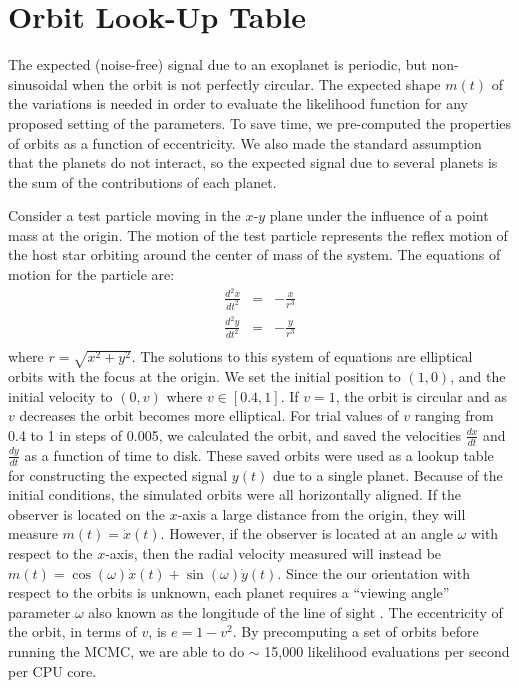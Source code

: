 \documentclass[useAMS,usenatbib]{mn2e}
\begin{document}
\section{Orbit Look-Up Table}\label{sec:orbits}
The expected (noise-free) signal due to an exoplanet is periodic, but
non-sinusoidal when the orbit is not perfectly circular. The expected
shape $m(t)$ of the variations is needed in order to evaluate the likelihood
function for any proposed setting of the parameters.
To save time, we pre-computed the properties of orbits as a function of
eccentricity. We also made the standard assumption that the planets do not
interact, so the expected signal due to several planets is the sum of the
contributions of each planet.

Consider a test particle moving in the $x$-$y$ plane under the influence of a
point mass at the origin. The motion of the test particle represents the
reflex motion of the host star orbiting around the center of mass of the
system. The equations of motion for the particle are:
\begin{eqnarray}
\frac{d^2x}{dt^2} &=& -\frac{x}{r^3} \\
\frac{d^2y}{dt^2} &=& -\frac{y}{r^3} \\
\end{eqnarray}
where $r = \sqrt{x^2 + y^2}$. The solutions to this system of equations are elliptical orbits
with the focus at the origin. We set the initial position to $(1, 0)$, and
the initial velocity to $(0, v)$ where $v \in [0.4, 1]$.
If $v=1$, the orbit is circular and as $v$ decreases the orbit becomes more
elliptical. For trial values of $v$ ranging from 0.4 to 1 in steps of 0.005,
we calculated the orbit, and saved the
velocities $\frac{dx}{dt}$ and $\frac{dy}{dt}$ as a function of time to disk.
These saved orbits were used as a lookup table for constructing the expected
signal $y(t)$ due to a single planet.
Because of the initial conditions, the simulated orbits were all horizontally
aligned. If the observer is located on the $x$-axis a large distance
from the origin, they will measure $m(t) = \dot{x}(t)$. However, if the
observer is located at an angle $\omega$ with respect to the $x$-axis, then
the radial velocity measured will instead be
$m(t) = \cos(\omega)\dot{x}(t) + \sin(\omega)\dot{y}(t)$.
Since the our orientation with respect to the orbits is unknown, each planet
requires a ``viewing angle'' parameter $\omega$ also known as the longitude
of the line of sight \citep{ohta}.
The eccentricity of the orbit, in terms of $v$, is $e = 1 - v^2$.
By precomputing a set of orbits before running the MCMC, we are able to
do $\sim$ 15,000 likelihood evaluations per second per CPU core.
\end{document}
